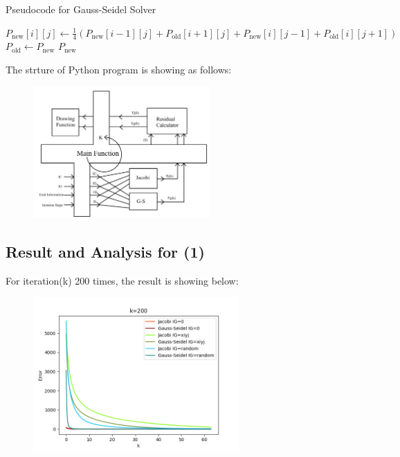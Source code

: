 \documentclass[12pt]{article}
\begin{document}
\begin{algorithm}
    \caption{Pseudocode for Gauss-Seidel Solver}
    \begin{algorithmic}[1]
                    \State $P_{\text{new}}[i][j]
                    \gets \frac{1}{4} (P_{\text{new}}[i-1][j] + P_{\text{old}}[i+1][j] + P_{\text{new}}[i][j-1] + P_{\text{old}}[i][j+1])$\\
                    $P_{\text{old}} \gets P_{\text{new}}$
                \EndFor
            \EndFor
            \State \Return $P_{\text{new}}$
        \EndFunction

    \end{algorithmic}
\end{algorithm}






The strture of Python program is showing as follows:



\begin{figure}[H]
    \centering
    \includegraphics[width=0.6\textwidth]{diagram1.jpg}
    \label{diagram.jpg}
\end{figure}



\subsection{Result and Analysis for (1)}
For iteration(k) 200 times, the result is showing below:


\begin{figure}[H]
    \centering
    \includegraphics[width=0.7\textwidth]{plotall.jpg}
    \label{plotall.jpg}
\end{figure}
\end{document}
